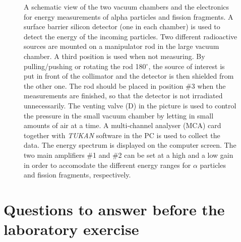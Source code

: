 \documentclass[12pt]{article}
\begin{document}
\begin{figure}
\begin{center}
\caption{A schematic view of the two vacuum chambers and the electronics
  for energy measurements of alpha particles and fission fragments. A
  surface barrier silicon detector (one in each chamber) is used to
  detect the energy of the incoming particles.  Two different
  radioactive sources are mounted on a manipulator rod in the large
  vacuum chamber. A third position is used when not measuring.  By
  pulling/pushing or rotating the rod 180$^\circ$, the source of
  interest is put in front of the collimator and the detector is then
  shielded from the other one. The rod should be placed in
  position \#3 when the measurements are finished, so that the
  detector is not irradiated unnecessarily.  The venting valve (D) in
  the picture is used to control the pressure in the small vacuum
  chamber by letting in small amounts of air at a time. A
  multi-channel analyser (MCA) card together with \emph{TUKAN} software
  in the PC is used to collect the data. The energy spectrum is 
  displayed on the computer screen. The two main amplifiers \#1 and \#2 
  can be set at a high and a low gain in order to accomodate 
  the different energy ranges for $\alpha$ particles and fission fragments, respectively.}
\label{fig:setup1}
\end{center}
\end{figure}

\section*{Questions to answer before the laboratory exercise}
\end{document}
